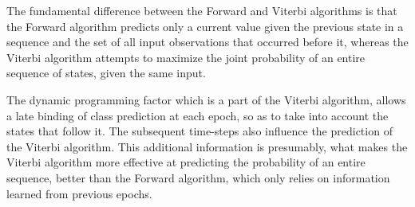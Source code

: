\documentclass[parskip=half]{scrartcl}
\begin{document}
            The fundamental difference between the Forward and Viterbi algorithms is that the Forward algorithm predicts only a current value given the previous state in a sequence and the set of all input observations that occurred before it, whereas the Viterbi algorithm attempts to maximize the joint probability of an entire sequence of states, given the same input.

            The dynamic programming factor which is a part of the Viterbi algorithm, allows a late binding of class prediction at each epoch, so as to take into account the states that follow it. The subsequent time-steps also influence the prediction of the Viterbi algorithm. This additional information is presumably, what makes the Viterbi algorithm more effective at predicting the probability of an entire sequence, better than the Forward algorithm, which only relies on information learned from previous epochs.
        

    

\end{document}
